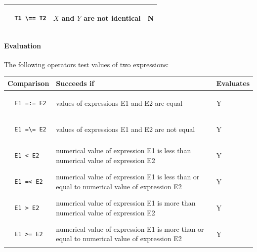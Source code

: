 \documentclass{article}
\begin{document}
\begin{multicols}{2}
\begin{tabular}{ | p{2cm} | p{4cm} | p{1.4cm} | }
  \begin{lstlisting}
  T1 \== T2
  \end{lstlisting} & $X$ and $Y$ are not identical & N \\
  \hline
  \end{tabular}
  
  \paragraph{Evaluation} The following operators test values of two expressions:
  
  \noindent \begin{tabular}{ | p{2cm} | p{4cm} | p{1.4cm} | }
  \hline
  \bf Comparison & \bf Succeeds if & \bf Evaluates \\
  \hline
  
  
  \begin{lstlisting}
  E1 =:= E2
  \end{lstlisting} & values of expressions E1 and E2 are equal & Y \\
  \hline
  
  \begin{lstlisting}
  E1 =\= E2
  \end{lstlisting} & values of expressions E1 and E2 are not equal & Y \\
  \hline
  
  \begin{lstlisting}
  E1 < E2
  \end{lstlisting} & numerical value of expression E1 is less than numerical value of expression E2 & Y \\
  \hline
  
  \begin{lstlisting}
  E1 =< E2
  \end{lstlisting} & numerical value of expression E1 is less than or equal to numerical value of expression E2 & Y \\
  \hline
  
  \begin{lstlisting}
  E1 > E2
  \end{lstlisting} & numerical value of expression E1 is more than numerical value of expression E2 & Y \\
  \hline
  
  \begin{lstlisting}
  E1 >= E2
  \end{lstlisting} & numerical value of expression E1 is more than or equal to numerical value of expression E2 & Y \\
  \hline
  \end{tabular}
  

\end{multicols}
\end{document}
